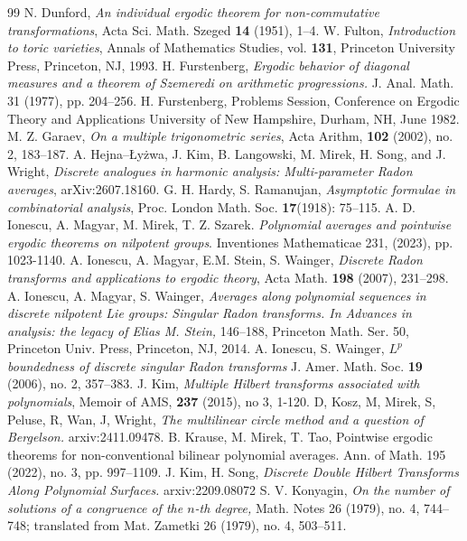 \documentclass[10pt,a4paper]{amsart}
\numberwithin{equation}{section}
\begin{document}
\begin{thebibliography}{99}
 N. Dunford, \emph{An individual ergodic theorem for non-commutative transformations}, Acta Sci. Math. Szeged \textbf{14 } (1951), 1--4.
 W. Fulton, \emph{Introduction to toric varieties}, Annals of Mathematics Studies, vol. \textbf{131}, Princeton University Press, Princeton, NJ, 1993.
 H. Furstenberg, \emph{Ergodic behavior of diagonal measures and a theorem of Szemeredi on arithmetic progressions.} J. Anal. Math. 31 (1977), pp. 204–256.
 H. Furstenberg, Problems Session, Conference on Ergodic Theory and Applications University of New Hampshire, Durham, NH, June 1982.
 M. Z. Garaev, \emph{On a multiple trigonometric series}, Acta Arithm, \textbf{102} (2002), no. 2, 183–187.
 A. Hejna--Łyżwa, J. Kim, B. Langowski, M. Mirek, H. Song, and J. Wright, \emph{Discrete analogues in harmonic analysis: Multi-parameter Radon averages}, arXiv:2607.18160.
 G. H. Hardy, S. Ramanujan, \emph{Asymptotic formulae in combinatorial analysis}, Proc. London Math. Soc. \textbf{17}(1918): 75--115.
 A. D. Ionescu, A. Magyar, M. Mirek, T. Z. Szarek. \emph{Polynomial averages and pointwise ergodic theorems on nilpotent groups}. Inventiones Mathematicae 231, (2023), pp. 1023-1140.
 A. Ionescu, A. Magyar, E.M. Stein, S. Wainger, \emph{Discrete Radon transforms and applications to ergodic theory}, Acta Math. \textbf{198} (2007), 231--298.
 A. Ionescu, A. Magyar, S. Wainger, \emph{ Averages along polynomial sequences in discrete nilpotent Lie groups: Singular Radon transforms. In Advances in analysis: the legacy of Elias M. Stein,} 146--188, Princeton Math. Ser. 50, Princeton Univ. Press, Princeton, NJ, 2014.
 A. Ionescu, S. Wainger, \emph{$L^p$ boundedness of discrete singular Radon transforms} J. Amer. Math. Soc. \textbf{19} (2006), no. 2, 357--383.
 J. Kim, \emph{Multiple Hilbert transforms associated with polynomials}, Memoir of AMS, \textbf{237} (2015), no 3, 1-120.
 D, Kosz, M, Mirek, S, Peluse, R, Wan, J, Wright, \emph{The multilinear circle method and a question of Bergelson.} arxiv:2411.09478.
 B. Krause, M. Mirek, T. Tao, Pointwise ergodic theorems for non-conventional bilinear polynomial averages. Ann. of Math. 195 (2022), no. 3, pp. 997–1109.
 J. Kim, H. Song, \emph{Discrete Double Hilbert Transforms Along Polynomial Surfaces.} arxiv:2209.08072
 S. V. Konyagin, \emph{On the number of solutions of a congruence of the $n$-th degree,} Math. Notes 26 (1979), no. 4, 744–748; translated from Mat. Zametki 26 (1979), no. 4, 503–511.

\end{thebibliography}
\end{document}
